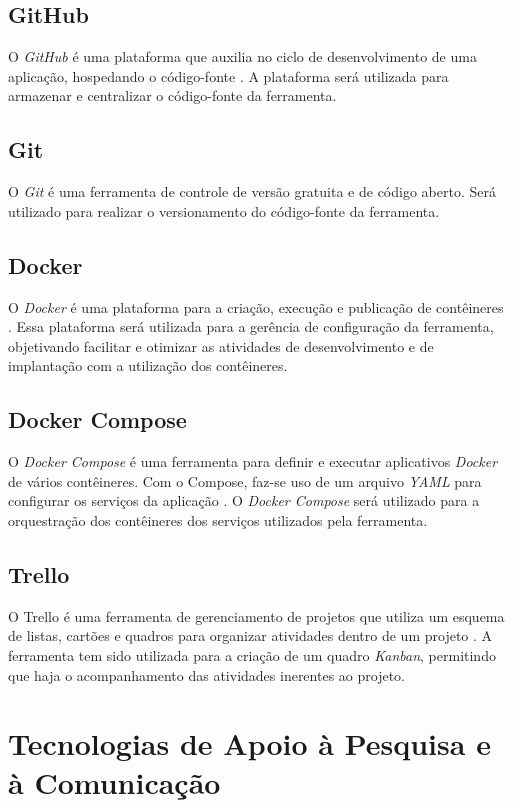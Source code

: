 \subsection{GitHub}
O \textit{GitHub} é uma plataforma que auxilia no ciclo de desenvolvimento de uma aplicação, hospedando o código-fonte \cite{github}. A plataforma será utilizada para armazenar e centralizar o código-fonte da ferramenta.

\subsection{Git}
O \textit{Git} é uma ferramenta de controle de versão gratuita e de código aberto\cite{git}. Será utilizado para realizar o versionamento do código-fonte da ferramenta.

\subsection{Docker}
O \textit{Docker} é uma plataforma para a criação, execução e publicação de contêineres \cite{docker}. Essa plataforma será utilizada para a gerência de configuração da ferramenta, objetivando facilitar e otimizar as atividades de desenvolvimento e de implantação com a utilização dos contêineres.

\subsection{Docker Compose}
O \textit{Docker Compose} é uma ferramenta para definir e executar aplicativos \textit{Docker} de vários contêineres. Com o Compose, faz-se uso de um arquivo \textit{YAML} para configurar os serviços da aplicação \cite{docker-compose}. O \textit{Docker Compose} será utilizado para a orquestração dos contêineres dos serviços utilizados pela ferramenta.

\subsection{Trello}
O Trello é uma ferramenta de gerenciamento de projetos que utiliza um esquema de listas, cartões e quadros para organizar atividades dentro de um projeto \cite{trello}. A ferramenta tem sido utilizada para a criação de um quadro \textit{Kanban}, permitindo que haja o acompanhamento das atividades inerentes ao projeto.

\section{Tecnologias de Apoio à Pesquisa e à Comunicação}
